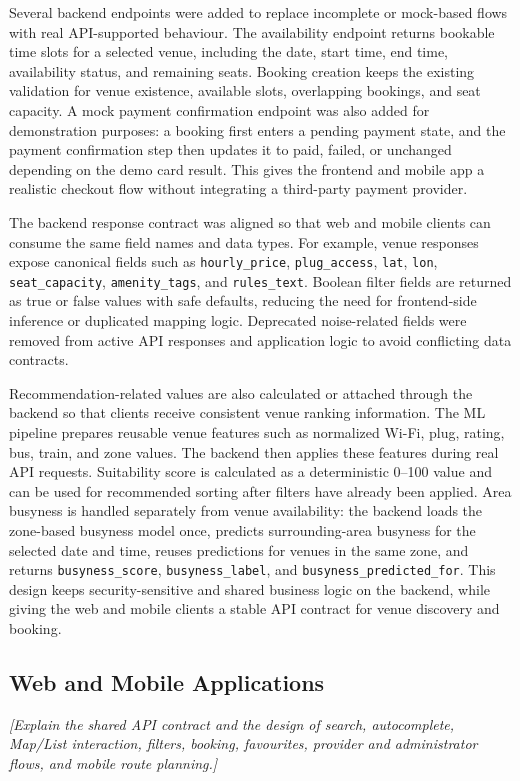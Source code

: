 ﻿\documentclass[conference,a4paper]{IEEEtran}
\begin{document}
Several backend endpoints were added to replace incomplete or mock-based flows with real API-supported behaviour. The availability endpoint returns bookable time slots for a selected venue, including the date, start time, end time, availability status, and remaining seats. Booking creation keeps the existing validation for venue existence, available slots, overlapping bookings, and seat capacity. A mock payment confirmation endpoint was also added for demonstration purposes: a booking first enters a pending payment state, and the payment confirmation step then updates it to paid, failed, or unchanged depending on the demo card result. This gives the frontend and mobile app a realistic checkout flow without integrating a third-party payment provider.

The backend response contract was aligned so that web and mobile clients can consume the same field names and data types. For example, venue responses expose canonical fields such as \texttt{hourly\_price}, \texttt{plug\_access}, \texttt{lat}, \texttt{lon}, \texttt{seat\_capacity}, \texttt{amenity\_tags}, and \texttt{rules\_text}. Boolean filter fields are returned as true or false values with safe defaults, reducing the need for frontend-side inference or duplicated mapping logic. Deprecated noise-related fields were removed from active API responses and application logic to avoid conflicting data contracts.

Recommendation-related values are also calculated or attached through the backend so that clients receive consistent venue ranking information. The ML pipeline prepares reusable venue features such as normalized Wi-Fi, plug, rating, bus, train, and zone values. The backend then applies these features during real API requests. Suitability score is calculated as a deterministic 0--100 value and can be used for recommended sorting after filters have already been applied. Area busyness is handled separately from venue availability: the backend loads the zone-based busyness model once, predicts surrounding-area busyness for the selected date and time, reuses predictions for venues in the same zone, and returns \texttt{busyness\_score}, \texttt{busyness\_label}, and \texttt{busyness\_predicted\_for}. This design keeps security-sensitive and shared business logic on the backend, while giving the web and mobile clients a stable API contract for venue discovery and booking.

\subsection{Web and Mobile Applications}
\textit{[Explain the shared API contract and the design of search,
autocomplete, Map/List interaction, filters, booking, favourites, provider
and administrator flows, and mobile route planning.]}
\end{document}
